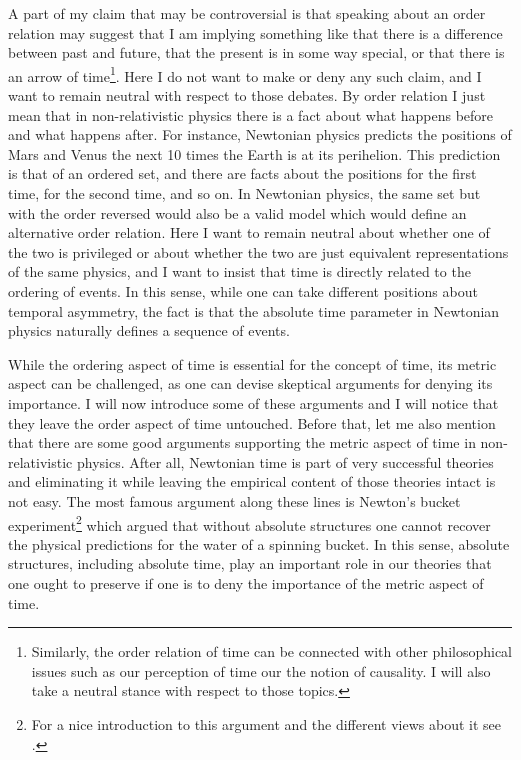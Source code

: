 \documentclass[12 pt]{article}
\begin{document}
A part of my claim that may be controversial is that speaking about an order relation may suggest that I am implying something like that there is a difference between past and future, that the present is in some way special, or that there is an arrow of time\footnote{Similarly, the order relation of time can be connected with other philosophical issues such as our perception of time our the notion of causality. I will also take a neutral stance with respect to those topics.}. Here I do not want to make or deny any such claim, and I want to remain neutral with respect to those debates. By order relation I just mean that in non-relativistic physics there is a fact about what happens before and what happens after. For instance, Newtonian physics predicts the positions of Mars and Venus the next 10 times the Earth is at its perihelion. This prediction is that of an ordered set, and there are facts about the positions for the first time, for the second time, and so on. In Newtonian physics, the same set but with the order reversed would also be a valid model which would define an alternative order relation. Here I want to remain neutral about whether one of the two is privileged or about whether the two are just equivalent representations of the same physics, and I want to insist that time is directly related to the ordering of events. In this sense, while one can take different positions about temporal asymmetry, the fact is that the absolute time parameter in Newtonian physics naturally defines a sequence of events.

While the ordering aspect of time is essential for the concept of time, its metric aspect can be challenged, as one can devise skeptical arguments for denying its importance. I will now introduce some of these arguments and I will notice that they leave the order aspect of time untouched. Before that, let me also mention that there are some good arguments supporting the metric aspect of time in non-relativistic physics. After all, Newtonian time is part of very successful theories and eliminating it while leaving the empirical content of those theories intact is not easy. The most famous argument along these lines is Newton's bucket experiment\footnote{For a nice introduction to this argument and the different views about it see \cite{Pooley2013}.} which argued that without absolute structures one cannot recover the physical predictions for the water of a spinning bucket. In this sense, absolute structures, including absolute time, play an important role in our theories that one ought to preserve if one is to deny the importance of the metric aspect of time.
\end{document}
